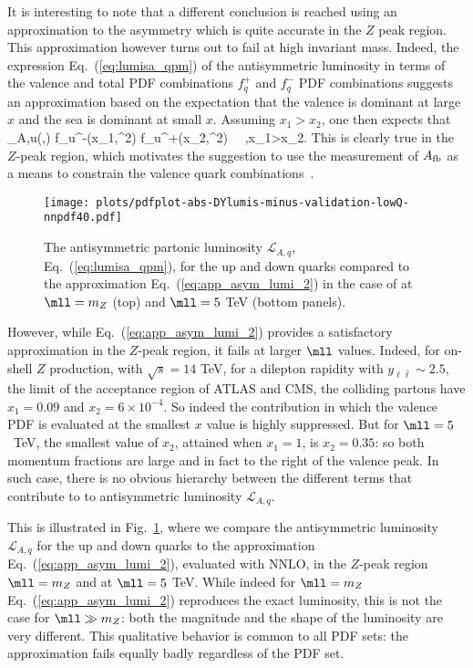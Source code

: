 It is interesting to note that a different conclusion is reached using
an approximation to the asymmetry which is quite accurate  in the $Z$
peak region.
%
This approximation however turns out to fail at high
invariant mass.
%
Indeed, the expression Eq.~(\ref{eq:lumisa_qpm}) of the antisymmetric
luminosity in terms of the valence 
and total PDF combinations $f_q^+$ and $f_q^-$ PDF combinations
suggests an approximation based on the expectation
that the valence is dominant at large $x$ and the sea is dominant at
small $x$. Assuming $x_1> x_2$, one then expects that
\be
{}_{A,u}(\yll,\mll) \approx{} f_u^-(x_1,\mll^2)
f_{u}^+(x_2,\mll^2)   \,  \, ,\quad x_1>x_2.
\label{eq:app_asym_lumi_2}
\ee
This is clearly true  in the $Z$-peak region, which  motivates the
suggestion to use the measurement of $A_{\rm fb}$ as a means to
 constrain the valence quark combinations~\cite{Accomando:2019vqt}.

\begin{figure}[!t]
 \centering
 \texttt{[image: plots/pdfplot-abs-DYlumis-minus-validation-lowQ-nnpdf40.pdf]}
 \caption{The  antisymmetric partonic luminosity $\mathcal{L}_{A,q}$, Eq.~(\ref{eq:lumisa_qpm}),
for the up and down quarks 
compared to the approximation 
Eq.~(\ref{eq:app_asym_lumi_2}) in the case of 
at $\mll=m_Z$ (top)
and $\mll=5$ TeV (bottom panels).
 }    
 \label{fig:pdfplot-abs-DYlumis-minus-validation-lowQ-nnpdf40}
\end{figure}

However, while Eq.~(\ref{eq:app_asym_lumi_2}) provides
a satisfactory approximation in the  $Z$-peak region,
it fails  at larger $\mll$ values. Indeed, for on-shell $Z$
production, with $\sqrt{s}=14$ TeV,
for a dilepton rapidity with $y_{\ell\bar{\ell}}\sim 2.5$, the limit of the
acceptance region
of ATLAS and CMS, the colliding partons have
$x_1=0.09$ and $x_2=6\times 10^{-4}$. So indeed the contribution in
which the valence PDF is evaluated at the smallest $x$ value is highly suppressed.
%
But for $\mll=5$~TeV, the smallest value of $x_2$, attained when
$x_1=1$, is $x_2=0.35$: so both momentum fractions are large and in fact
to the right of the valence peak.
%
In such case, there 
is no obvious hierarchy between
the different terms that contribute to to antisymmetric
luminosity $\mathcal{L}_{A,q}$.

This is illustrated in
Fig.~\ref{fig:pdfplot-abs-DYlumis-minus-validation-lowQ-nnpdf40},
where we compare the antisymmetric luminosity $\mathcal{L}_{A,q}$
for the up and down quarks 
to the approximation
Eq.~(\ref{eq:app_asym_lumi_2}), evaluated with  NNLO,
in the $Z$-peak region $\mll=m_Z$ 
and at $\mll=5$ TeV.
%
While indeed for $\mll=m_Z$ Eq.~(\ref{eq:app_asym_lumi_2}) reproduces
the exact luminosity, this is not the case for $\mll\gg m_Z$: both
the magnitude and the shape of the luminosity are  very different.
%
This qualitative behavior is common to all PDF sets: the approximation
fails equally badly regardless of the PDF set.

